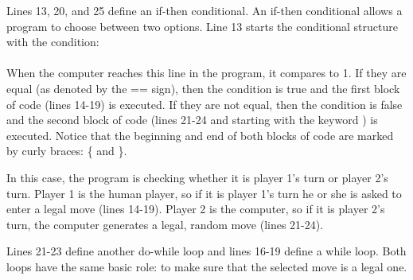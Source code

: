 
Lines 13, 20, and 25 define an if-then conditional.  An if-then conditional allows a program to choose between two options.  
Line 13 starts the conditional structure with the condition:\\
\\
When the computer reaches this line in the program, it compares  to 1.  If they are equal (as denoted by the == sign), then the condition is true and the first block of code (lines 14-19)  is executed.  If they are not equal, then the condition is false and the second block of code (lines 21-24 and starting with the keyword ) is executed.  Notice that the beginning and end of both blocks of code are marked by curly braces: \{ and \}.

In this case, the program is checking whether it is player 1's turn or player 2's turn.  Player 1 is the human player, so if it is player 1's turn he or she is asked to enter a legal move (lines 14-19).  Player 2 is the computer, so if it is player 2's turn, the computer generates a legal, random move (lines 21-24).


Lines 21-23 define another do-while loop and lines 16-19 define a while loop.  Both loops have the same basic role: to make sure that the selected move is a legal one.  

